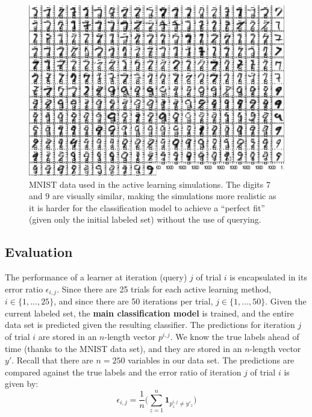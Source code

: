 \begin{figure}[H]
	\begin{center}
		\includegraphics[width=1\linewidth]{ch-al/figures/data.pdf}
		\caption[MNIST data used in the active learning simulations.]{MNIST 
		data used in the active learning
		simulations. The digits 7 and 9 are visually similar, making 
		the simulations more realistic as it is harder for the classification 
		model to achieve a ``perfect fit'' (given only the initial labeled set) 
		without the use of querying.}
		\label{fig:al:simulations:data}
	\end{center}
\end{figure}

\subsection{Evaluation}
\label{sec:al:simulation:evaluation}
The performance of a learner at iteration (query) $j$ of trial $i$ is 
encapsulated in its error ratio $\epsilon_{i, j}$. Since there are 25 trials 
for each active learning method, $i \in \{1,...,25\}$, and since there are 50 
iterations per trial, $j \in \{1,...,50\}$. 
Given the current labeled set, the 
\textbf{main classification model} is trained, and the entire data set is 
predicted given the resulting classifier. The predictions for iteration $j$ of 
trial $i$ are stored in an $n$-length vector $p^{i,j}$. 
We know the true labels ahead of time (thanks to the MNIST data set), and they 
are stored in an $n$-length vector $y'$. Recall that there are $n = 250$ 
variables in our data set. The predictions are compared against 
the true labels and the error ratio of iteration $j$ of trial $i$ is given by:
$$\epsilon_{i,j} = \frac{1}{n} \bigg( \sum\limits_{z=1}^{n} 
\textbf{1}_{p^{i,j}_z \neq y'_z} \bigg)$$

